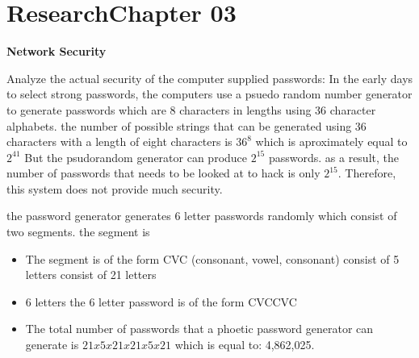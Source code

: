 \documentclass[../CIT288SecurityResearchNotebook.tex]{subfiles}
\begin{document}

\chapter[Research Ch. 03]{Research\linebreak[1] Chapter 03 \hspace*{\fill}{\date}}
\noindent\textbf{{Network Security} }                             



Analyze the actual security of the computer supplied passwords: In the early days to select strong passwords, the computers use a psuedo random number generator to generate passwords which are 8 characters in lengths using 36 character alphabets.  the number of possible strings that can be generated using 36 characters with a length of eight characters is ${36}^{8}$  which is aproximately equal to ${2}^{41}$ But the psudorandom generator can produce ${2}^{15}$ passwords. as a result, the number of passwords that needs to be looked at to hack is only ${2}^{15}$.  Therefore, this system does not provide much security.




the password generator generates 6 letter passwords randomly which consist of two segments. the segment is 
\begin{itemize}
	\item{The segment} is of the form CVC (consonant, vowel, consonant) 
		 consist of 5 letters
		 consist of 21 letters
	\item{6 letters} the 6 letter password is of the form CVCCVC
\item{The total number} of passwords that a phoetic password generator can generate is ${21x5x21x21x5x21}$ which is equal to: 4,862,025.
\end{itemize}
\end{document}
